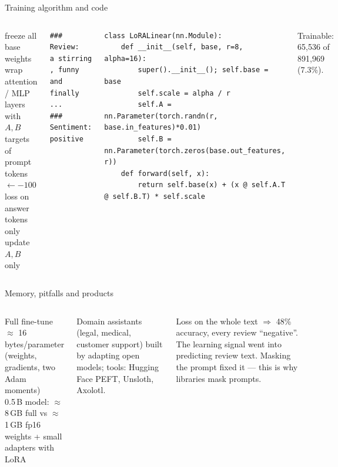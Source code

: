 \documentclass[aspectratio=169,11pt]{beamer}
\newcommand{\rLoraParams}{65,536}
\newcommand{\rLoraPct}{7.3}
\begin{document}
\begin{frame}[fragile]{Training algorithm and code}
\begin{columns}[T]
\begin{balgo}
\begin{algorithmic}[1]
\State freeze all base weights
\State wrap attention / MLP layers with $A,B$
  \State targets of prompt tokens $\gets -100$
  \State loss on answer tokens only
  \State update $A,B$ only
\EndFor
\end{algorithmic}
\end{balgo}
\begin{bcode}
\begin{lstlisting}
### Review:
a stirring , funny and finally ...
### Sentiment: positive
\end{lstlisting}
\end{bcode}
\begin{bcode}
\begin{lstlisting}
class LoRALinear(nn.Module):
    def __init__(self, base, r=8, alpha=16):
        super().__init__(); self.base = base
        self.scale = alpha / r
        self.A = nn.Parameter(torch.randn(r, base.in_features)*0.01)
        self.B = nn.Parameter(torch.zeros(base.out_features, r))
    def forward(self, x):
        return self.base(x) + (x @ self.A.T @ self.B.T) * self.scale
\end{lstlisting}
\end{bcode}
\begin{bres}
Trainable: \rLoraParams{} of 891,969 (\rLoraPct\%).
\end{bres}
\end{columns}
\end{frame}

\begin{frame}{Memory, pitfalls and products}
\begin{columns}[T]
\begin{bmath}
Full fine-tune $\approx$ 16 bytes/parameter\\ (weights, gradients, two Adam moments)\\[2pt]
0.5\,B model: $\approx$ 8\,GB full vs $\approx$ 1\,GB fp16 weights + small adapters with LoRA
\end{bmath}
\begin{bapp}
Domain assistants (legal, medical, customer support) built by adapting open models; tools: Hugging Face PEFT, Unsloth, Axolotl.
\end{bapp}
\begin{bwarn}
Loss on the whole text $\Rightarrow$ 48\% accuracy, every review ``negative''. The learning signal went into predicting review text. Masking the prompt fixed it --- this is why libraries mask prompts.
\end{bwarn}
\end{columns}
\end{frame}
\end{document}
